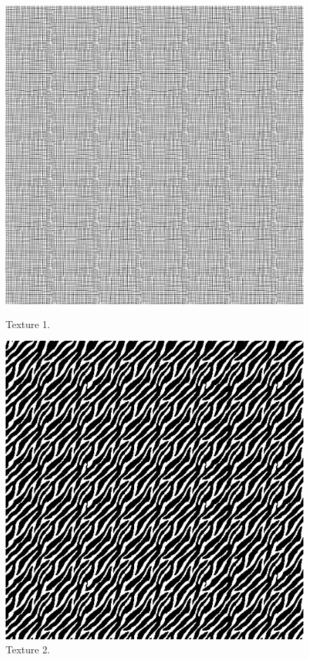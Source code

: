 \documentclass[12pt,a4paper,notitlepage,oneside,amsmath,amssymb]{article}
\begin{document}
\begin{CJK*}{UTF8}{bkai}
\begin{enumerate}[label=(\alph*)]
\begin{figure}[hbt!]
	\centering
	\begin{minipage}{.25\textwidth}
		\centering
		\includegraphics[width=.85\linewidth]{synthesized_texture1}
		\caption*{Texture 1.}
	\end{minipage}%
	\begin{minipage}{.25\textwidth}
		\centering
		\includegraphics[width=.85\linewidth]{synthesized_texture2}
		\caption*{Texture 2.}
	\end{minipage}%

\end{figure}
\end{enumerate}
\end{CJK*}
\end{document}
